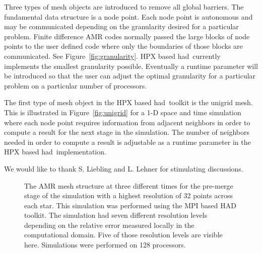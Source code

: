 \documentclass[prd,aps,showpacs,nofootinbib,floats,floatfix,twocolumn,letterpaper]{revtex4}
\newcommand{\had}{{\sc had}}
\begin{document}
Three types of mesh objects are introduced to remove all global barriers.  The fundamental
data structure is a node point.  Each node point is autonomous and may be communicated
depending on the granularity desired for a particular problem.  
Finite difference AMR codes normally passed the large blocks of node points to the user defined
code where only the boundaries of those blocks are communicated.  See Figure~\ref{fig:granularity}.
HPX based \had\ currently implements the smallest granularity possible.  Eventually 
a runtime parameter will be introduced so that the user can adjust the optimal granularity for a
particular problem on a particular number of processors.  

The first type of mesh object in the HPX based \had\ toolkit is the unigrid mesh.  This is illustrated
 in Figure~\ref{fig:unigrid} for a 1-D space and time simulation where each node point requires information
from adjacent neighbors in order to compute a result for the next stage in the simulation.
The number of neighbors needed in order to compute a result is adjustable as a runtime parameter 
in the HPX based \had\ implementation.

%
%
We would like to thank
S. Liebling and L. Lehner for
 stimulating  discussions.

%
%



\begin{figure}
\caption{The AMR mesh structure at three different times for the
    pre-merge stage of the simulation with
      a highest resolution of 32 points across each star. This simulation
      was performed using the MPI based HAD toolkit.
    The simulation had seven different resolution levels depending on the relative
error measured locally in the computational domain.  Five of those resolution levels are visible
here.  Simulations were performed on 128 processors.} \label{fig:amr_mesh}
\end{figure}
\end{document}
